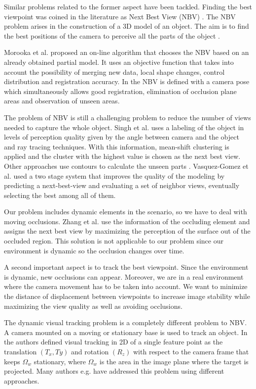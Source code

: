 \documentclass[10pt,twocolumn,letterpaper]{article}
\begin{document}
Similar problems related to the former aspect have been tackled. Finding the best viewpoint was coined in the literature as Next Best View (NBV) \cite{Morooka1998}. The NBV problem arises in the construction of a 3D model of an object. The aim is to find the best positions of the camera to perceive all the parts of the object \cite{Massios1998, Sanchiz1999,Pito1999,Karaszewski2016}.

Morooka et al. \cite{Morooka1998} proposed an on-line algorithm that chooses the NBV based on an already obtained partial model. It uses an objective function that takes into account the possibility of merging new data, local shape changes, control distribution and registration accuracy. In \cite{Sanchiz1999} the NBV is defined with a camera pose which simultaneously allows good registration, elimination of occlusion plane areas and observation of unseen areas. 

The problem of NBV is still a challenging problem to reduce the number of views needed to capture the whole object. Singh et al. \cite{Singh2015} uses a labeling of the object in levels of perception quality given by the angle between camera and the object and ray tracing techniques. With this information, mean-shift clustering is applied and the cluster with the highest value is chosen as the next best view. Other approaches use contours to calculate the unseen parts \cite{Monica2017}. Vasquez-Gomez et al. \cite{Vasquez-Gomez2014} used a two stage system that improves the quality of the modeling by predicting a next-best-view and evaluating a set of neighbor views, eventually selecting the best among all of them.

Our problem includes dynamic elements in the scenario, so we have to deal with moving occlusions. Zhang et al. \cite{Zhang2017} use the information of the occluding element and assigns the next best view by maximizing the perception of the surface out of the occluded region. This solution is not applicable to our problem since our environment is dynamic so the occlusion changes over time. 

A second important aspect is to track the best viewpoint. Since the environment is dynamic, new occlusions can appear. Moreover, we are in a real environment where the camera movement has to be taken into account. We want to minimize the distance of displacement between viewpoints to increase image stability while maximizing the view quality as well as avoiding occlusions.

The dynamic visual tracking problem is a completely different problem to NBV. A camera mounted on a moving or stationary base is used to track an object. In \cite{Papanikolopoulos1993} the authors defined visual tracking in 2D of a single feature point as the translation $(T_{x},T{y})$ and rotation $(R_{z})$ with respect to the camera frame that keeps $\Omega_{w}$ stationary, where $\Omega_{w}$ is the area in the image plane where the target is projected. Many authors e.g. \cite{Papanikolopoulos1993,Hunt1982} have addressed this problem using different approaches.
\end{document}
